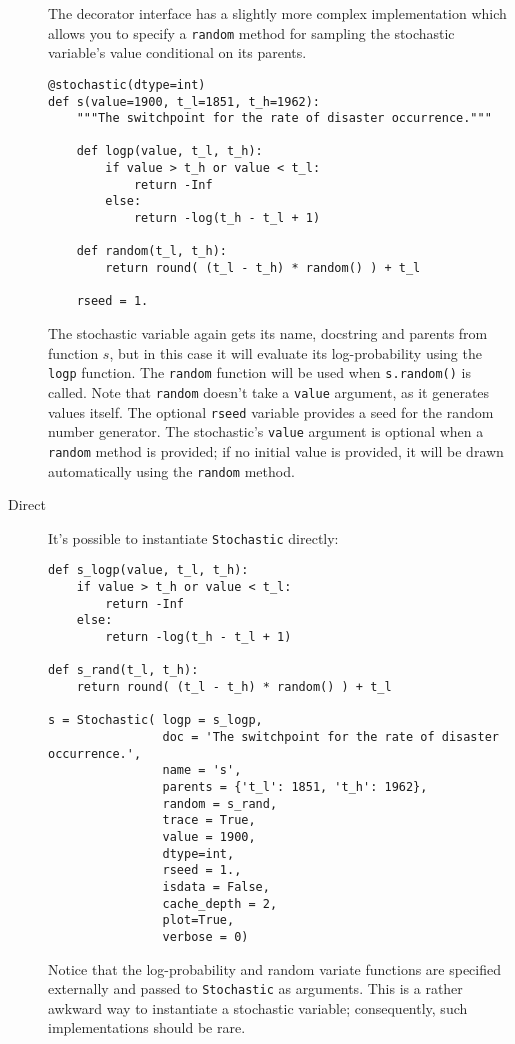 \begin{description}
    The decorator interface has a slightly more complex implementation which allows you to specify a \texttt{random} method for sampling the stochastic variable's value conditional on its parents.
    \begin{verbatim}
@stochastic(dtype=int)
def s(value=1900, t_l=1851, t_h=1962):
    """The switchpoint for the rate of disaster occurrence."""

    def logp(value, t_l, t_h):
        if value > t_h or value < t_l:
            return -Inf
        else:
            return -log(t_h - t_l + 1) 
            
    def random(t_l, t_h):
        return round( (t_l - t_h) * random() ) + t_l

    rseed = 1.
    \end{verbatim}
The stochastic variable again gets its name, docstring and parents from function $s$, but in this case it will evaluate its log-probability using the \texttt{logp} function. The \texttt{random} function will be used when \texttt{s.random()} is called. Note that \texttt{random} doesn't take a \texttt{value} argument, as it generates values itself. The optional \texttt{rseed} variable provides a seed for the random number generator. The stochastic's \texttt{value} argument is optional when a \texttt{random} method is provided; if no initial value is provided, it will be drawn automatically using the \texttt{random} method.

    \item[Direct] It's possible to instantiate \texttt{Stochastic} directly:
\begin{verbatim}
def s_logp(value, t_l, t_h):
    if value > t_h or value < t_l:
        return -Inf
    else:
        return -log(t_h - t_l + 1) 

def s_rand(t_l, t_h):
    return round( (t_l - t_h) * random() ) + t_l

s = Stochastic( logp = s_logp, 
                doc = 'The switchpoint for the rate of disaster occurrence.',
                name = 's', 
                parents = {'t_l': 1851, 't_h': 1962},
                random = s_rand,                 
                trace = True,                 
                value = 1900,
                dtype=int,
                rseed = 1., 
                isdata = False,
                cache_depth = 2,
                plot=True,
                verbose = 0)
\end{verbatim}
Notice that the log-probability and random variate functions are specified externally and passed to \texttt{Stochastic} as arguments. This is a rather awkward way to instantiate a stochastic variable; consequently, such implementations should be rare.

\end{description}


